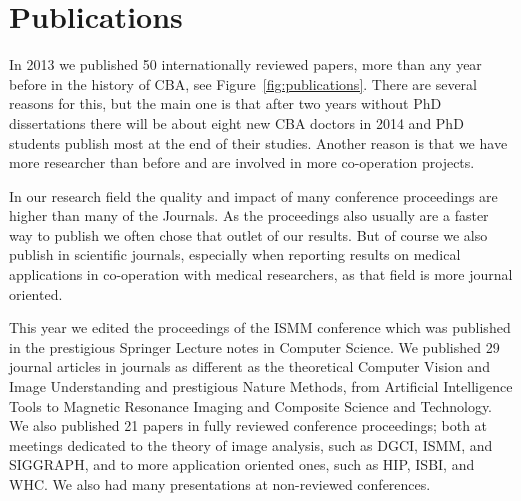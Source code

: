 \section{Publications}\label{publications}
{\large
In 2013 we published 50 internationally reviewed papers, more than any year before in the history of CBA, see Figure~\ref{fig:publications}. There are several reasons for this, but the main one is that after two years without PhD dissertations there will be about eight new CBA doctors in 2014 and PhD students publish most at the end of their studies. Another reason is that we have more researcher than before and are involved in more co-operation projects. 

In our research field the quality and impact of many conference proceedings are higher than many of the Journals. As the proceedings also usually are a faster way to publish we often chose that outlet of our results. But of course we also publish in scientific journals, especially when reporting results on medical applications in co-operation with medical researchers, as that field is more journal oriented. 

This year we edited the proceedings of the ISMM conference which was published in the prestigious Springer Lecture notes in Computer Science. We published 29 journal articles in journals as different as the theoretical Computer Vision and Image Understanding and prestigious Nature Methods, from Artificial Intelligence Tools to Magnetic Resonance Imaging and Composite Science and Technology. We also published 21 papers in fully reviewed conference proceedings; both at meetings dedicated to the theory of image analysis, such as DGCI, ISMM, and SIGGRAPH, and to more application oriented ones, such as HIP, ISBI, and WHC. We also had many presentations at non-reviewed conferences. 

}
